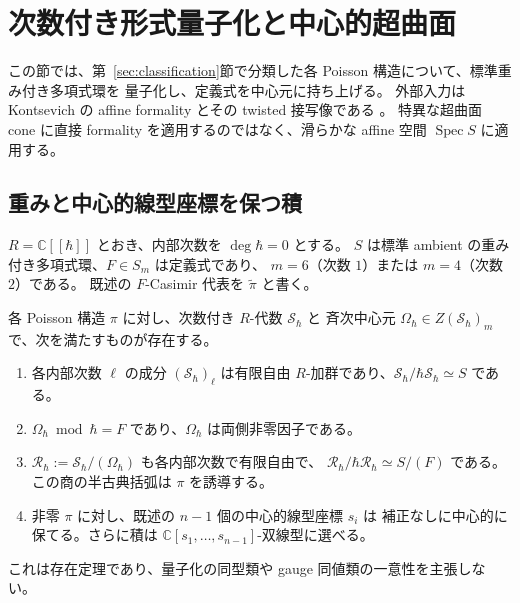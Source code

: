 \section{次数付き形式量子化と中心的超曲面}
\label{sec:quantization}

この節では、第~\ref{sec:classification}節で分類した各 Poisson 構造について、標準重み付き多項式環を
量子化し、定義式を中心元に持ち上げる。
外部入力は Kontsevich の affine formality とその twisted 接写像である
\cite[\S\S 4.6.2, 6, 8]{Kontsevich}。
特異な超曲面 cone に直接 formality を適用するのではなく、滑らかな affine
空間 $\operatorname{Spec}S$ に適用する。

\subsection{重みと中心的線型座標を保つ積}

$R=\mathbb C[[\hbar]]$ とおき、内部次数を $\deg\hbar=0$ とする。
$S$ は標準 ambient の重み付き多項式環、$F\in S_m$ は定義式であり、
$m=6$（次数 $1$）または $m=4$（次数 $2$）である。
既述の $F$-Casimir 代表を $\widetilde\pi$ と書く。

\begin{theorem}[中心的超曲面による形式量子化]
\label{thm:formal-quantization}
各 Poisson 構造 $\pi$ に対し、次数付き $R$-代数 $\mathcal S_\hbar$ と
斉次中心元 $\Omega_\hbar\in Z(\mathcal S_\hbar)_m$ で、次を満たすものが存在する。
\begin{enumerate}
\item 各内部次数 $\ell$ の成分 $(\mathcal S_\hbar)_\ell$ は有限自由
      $R$-加群であり、$\mathcal S_\hbar/\hbar\mathcal S_\hbar\simeq S$ である。
\item $\Omega_\hbar\bmod\hbar=F$ であり、$\Omega_\hbar$ は両側非零因子である。
\item $\mathcal R_\hbar:=\mathcal S_\hbar/(\Omega_\hbar)$ も各内部次数で有限自由で、
      $\mathcal R_\hbar/\hbar\mathcal R_\hbar\simeq S/(F)$ である。
      この商の半古典括弧は $\pi$ を誘導する。
\item 非零 $\pi$ に対し、既述の $n-1$ 個の中心的線型座標 $s_i$ は
      補正なしに中心的に保てる。さらに積は $\mathbb C[s_1,\ldots,s_{n-1}]$-双線型に選べる。
\end{enumerate}
これは存在定理であり、量子化の同型類や gauge 同値類の一意性を主張しない。
\end{theorem}

